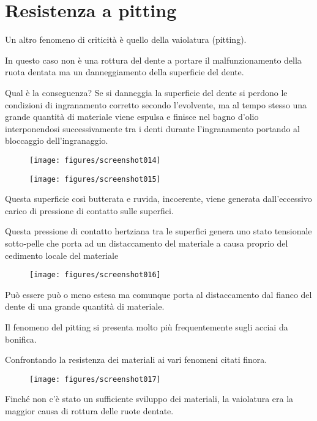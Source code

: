 \documentclass[a4paper, 15pt]{article}
\begin{document}
\section{Resistenza a pitting}
\begin{adjustwidth}{2in}{}
	Un altro fenomeno di criticità è quello della vaiolatura (pitting). 
	
	In questo caso non è una rottura del dente  a portare il malfunzionamento della ruota dentata ma un danneggiamento della superficie del dente. 
	
	Qual è la conseguenza? Se si danneggia la superficie del dente si perdono le condizioni di ingranamento corretto secondo l'evolvente, ma al tempo stesso una grande quantità di materiale viene espulsa e finisce nel bagno  d'olio interponendosi successivamente tra i denti durante l'ingranamento portando al bloccaggio dell'ingranaggio. 
	\begin{figure}[H]
		\parbox{0.45\textwidth}{\centering
		\texttt{[image: figures/screenshot014]}
		\label{fig:screenshot014}}
	\hfill
	\parbox{0.45\textwidth}{\centering\centering
		\texttt{[image: figures/screenshot015]}
		\label{fig:screenshot015}}
	\end{figure}
	Questa superficie così butterata e ruvida, incoerente, viene generata  dall'eccessivo carico di pressione di contatto sulle superfici. 
	
	Questa pressione di contatto hertziana tra le superfici genera uno stato tensionale sotto-pelle che porta ad un distaccamento del materiale a causa proprio del cedimento locale del materiale
	\begin{figure}[H]
		\centering
		\texttt{[image: figures/screenshot016]}
		\label{fig:screenshot016}
	\end{figure}
	Può essere può o meno estesa ma comunque porta al distaccamento dal fianco del dente di una grande quantità di materiale. \newline 
	
	Il fenomeno del pitting  si presenta molto più frequentemente sugli acciai da bonifica. 
	
	Confrontando la resistenza dei materiali ai vari fenomeni citati finora. 
	\begin{figure}[H]
		\centering
		\texttt{[image: figures/screenshot017]}
		\label{fig:screenshot017}
	\end{figure}
	Finché non c'è stato un sufficiente sviluppo dei materiali, la vaiolatura era la maggior causa di rottura delle ruote dentate. 
	

\end{adjustwidth}
\end{document}
